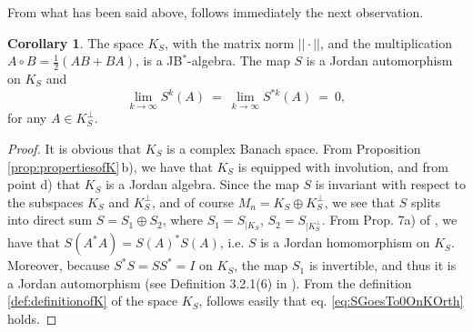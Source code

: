 \documentclass[12pt]{article}
\theoremstyle{plain}
\theoremstyle{definition}
\newtheorem{corollary}{Corollary}
\theoremstyle{remark}
\numberwithin{equation}{section}
\begin{document}
From what has been said above, 
follows immediately the next observation.

\begin{corollary}
\label{cor:KisJordanAlgebra}
The space $K_{S}$, with the matrix norm $|| \cdot ||$,
and the multiplication $A \circ B = \frac{1}{2}(AB + BA)$,
is a JB$^{*}$-algebra.
The map $S$ is a Jordan automorphism on $K_{S}$ and 
\begin{equation}
\label{eq:SGoesTo0OnKOrth}
    \lim \limits_{k\rightarrow \infty} S^{k}(A)  \: = \:
    \lim \limits_{k\rightarrow \infty} S^{*k}(A) \: = \: 0,
\end{equation}
for any $A \in K_{S}^{\perp}$.
\end{corollary}

\begin{proof}
It is obvious that $K_{S}$ is a complex Banach space. 
From Proposition \ref{prop:propertiesofK}\,b),
we have that $K_{S}$ is equipped with involution,
and from point d) 
that $K_{S}$ is a Jordan algebra.
Since the map $S$ is invariant with respect to the subspaces
$K_{S}$ and $K_{S}^{\perp}$,
and of course $M_{n} = K_{S} \oplus K_{S}^{\perp}$,
we see that $S$ splits into direct sum
$S = S_{1} \oplus S_{2}$,
where $S_{1} = S_{| K_{S}}$, $S_{2} = S_{| K_{S}^{\perp}}$.
From Prop. 7a) of
\cite{olkiewicz1999environment},
we have that $S(A^{*} A) = S(A)^{*} S(A)$,
i.e. $S$ is a Jordan homomorphism on $K_{S}$.
Moreover,
because $S^{*} S = S S^{*} = I$ on $K_{S}$,
the map $S_{1}$ is invertible,
and thus it is a Jordan automorphism
(see Definition 3.2.1(6) in \cite{bratteli2003operator}).
From the definition \eqref{def:definitionofK} of the space $K_{S}$,
follows easily that 
eq. \eqref{eq:SGoesTo0OnKOrth} holds.
\end{proof}
\end{document}
